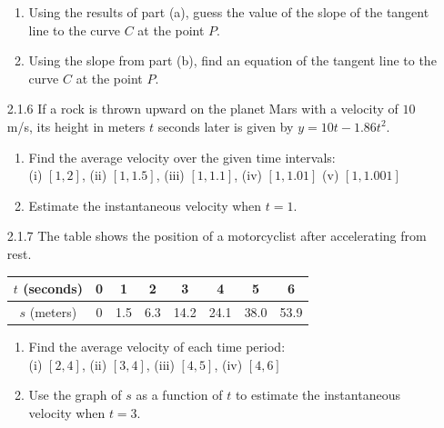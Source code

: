 \documentclass{article}
\begin{document}
\begin{enumerate}
\begin{enumerate}
            \item
                Using the results of part (a), guess the value of the slope of the tangent line to the curve $C$
                at the point $P$.

            \item
                Using the slope from part (b), find an equation of the tangent line to the curve $C$ at the point $P$.
        \end{enumerate}

    \newpage

    \item[2.1.6]
        If a rock is thrown upward on the planet Mars with a velocity of $10$ m/s,
        its height in meters $t$ seconds later is given by $y = 10t - 1.86t^{2}$.

        \begin{enumerate}
            \item
                Find the average velocity over the given time intervals:\\
                (i) $[1, 2]$, (ii) $[1, 1.5]$, (iii) $[1, 1.1]$, (iv) $[1, 1.01]$
                (v) $[1, 1.001]$
            \item
                Estimate the instantaneous velocity when $t=1$.
        \end{enumerate}
        \vspace{6cm}

    \item[2.1.7]
        The table shows the position of a motorcyclist after accelerating from rest.

        \begin{center}
            \begin{tabular}{ |c|c|c|c|c|c|c|c| }
                 \hline
                 $t$ (seconds) & 0 & 1 & 2 & 3 & 4 & 5 & 6 \\
                 \hline
                 $s$ (meters) & 0 & 1.5 & 6.3 & 14.2 & 24.1 & 38.0 & 53.9 \\
                 \hline
            \end{tabular}
        \end{center}

        \begin{enumerate}
            \item
                Find the average velocity of each time period: \\
                (i) $[2, 4]$, (ii) $[3, 4]$, (iii) $[4, 5]$, (iv) $[4, 6]$
            \item
                Use the graph of $s$ as a function of $t$ to estimate the
                instantaneous velocity when $t=3$.
        \end{enumerate}

\end{enumerate}
\end{document}
